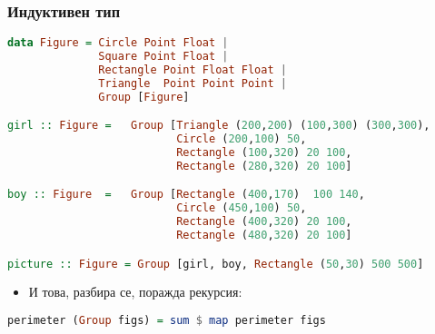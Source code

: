 \documentclass{beamer}
\begin{document}
\begin{frame}[fragile]
  \frametitle{Индуктивен тип}
\begin{lstlisting}[basicstyle=\tiny,language=Haskell]
data Figure = Circle Point Float | 
              Square Point Float |
              Rectangle Point Float Float |
              Triangle  Point Point Point |
              Group [Figure]

girl :: Figure =   Group [Triangle (200,200) (100,300) (300,300),
                          Circle (200,100) 50,
                          Rectangle (100,320) 20 100,
                          Rectangle (280,320) 20 100]

boy :: Figure  =   Group [Rectangle (400,170)  100 140, 
                          Circle (450,100) 50,
                          Rectangle (400,320) 20 100,
                          Rectangle (480,320) 20 100]

picture :: Figure = Group [girl, boy, Rectangle (50,30) 500 500]
\end{lstlisting}

\begin{itemize}
  \item И това, разбира се, поражда рекурсия:
\end{itemize}

\begin{lstlisting}[basicstyle=\small,language=Haskell]
perimeter (Group figs) = sum $ map perimeter figs
\end{lstlisting}


\end{frame}


\end{document}
